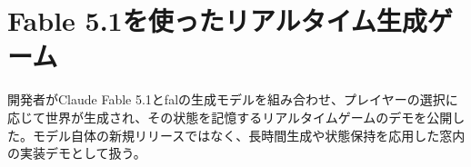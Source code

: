 \section{Fable 5.1を使ったリアルタイム生成ゲーム}

開発者がClaude Fable 5.1とfalの生成モデルを組み合わせ、プレイヤーの選択に応じて世界が生成され、その状態を記憶するリアルタイムゲームのデモを公開した。モデル自体の新規リリースではなく、長時間生成や状態保持を応用した窓内の実装デモとして扱う。


